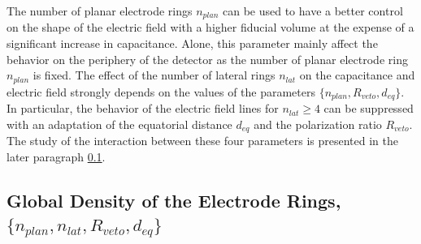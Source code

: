 The number of planar electrode rings $n_{plan}$ can be used to have a better control on the shape of the electric field with a higher fiducial volume at the expense of a significant increase in capacitance. Alone, this parameter mainly affect the behavior on the periphery of the detector as the number of planar electrode ring $n_{plan}$ is fixed. The effect of the number of lateral rings $n_{lat}$ on the capacitance and electric field strongly depends on the values of the parameters $\{n_{plan}, R_{veto}, d_{eq}\}$. In particular, the behavior of the electric field lines for $n_{lat} \geq 4$ can be suppressed with an adaptation of the equatorial distance $d_{eq}$ and the polarization ratio $R_{veto}$. The study of the interaction between these four parameters is presented in the later paragraph \ref{par:global-density}.

\subsection{Global Density of the Electrode Rings, $\{n_{plan}, n_{lat}, R_{veto}, d_{eq}\}$}
\label{par:global-density}

